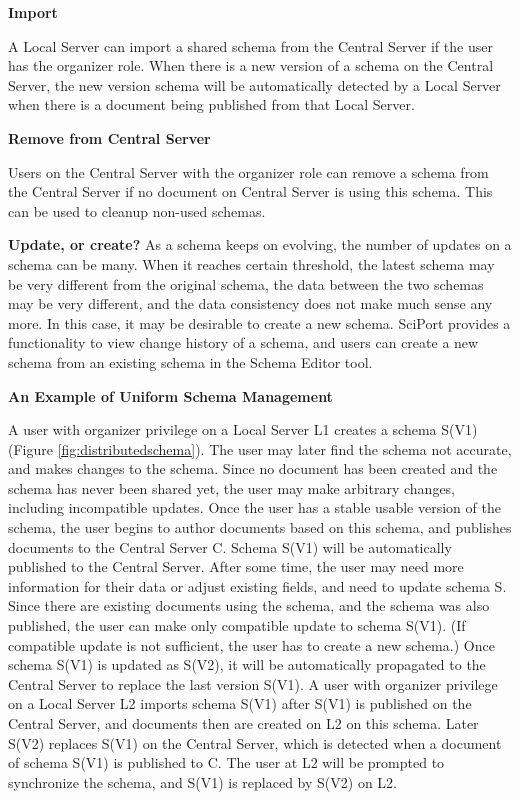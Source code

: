 \documentclass{doublecol-new}
\theoremstyle{TH}{
\newtheorem{lemma}{Lemma}
\newtheorem{theorem}[lemma]{Theorem}
\newtheorem{corrolary}[lemma]{Corrolary}
\newtheorem{conjecture}[lemma]{Conjecture}
\newtheorem{proposition}[lemma]{Proposition}
\newtheorem{claim}[lemma]{Claim}
\newtheorem{stheorem}[lemma]{Wrong Theorem}
\newtheorem{algorithm}{Algorithm}
}
\theoremstyle{THrm}{
\newtheorem{definition}{Definition}[section]
\newtheorem{question}{Question}[section]
\newtheorem{remark}{Remark}
\newtheorem{scheme}{Scheme}
}
\theoremstyle{THhit}{
\newtheorem{case}{Case}[section]
}
\begin{document}
\textbf{Import}

A Local Server can import a shared schema from the Central Server if
the user has the organizer role. When there is a new version of a
schema on the Central Server, the new version schema will be
automatically detected by a Local Server when there is a document
being published from that Local Server.

\textbf{Remove from Central Server}

Users on the Central Server with the organizer role can remove a
schema from the Central Server if no document on Central Server is
using this schema. This can be used to cleanup non-used schemas.

\textbf{Update, or create?}  As a schema  keeps on evolving, the
number of updates on a schema can be many. When it reaches certain
threshold, the latest schema may be very different from the original
schema, the data between the two schemas may be very different, and
the data consistency does not make much sense any more.  In this
case, it may be desirable to create a new schema.  SciPort provides
a functionality to view change history of a schema, and users can
create a new schema from an existing schema in the Schema Editor
tool.


\textbf{An Example of Uniform Schema Management}

A user with organizer privilege on a Local Server L1 creates a
schema S(V1) (Figure \ref{fig:distributedschema}). The user may
later find the schema not accurate, and makes changes to the schema.
Since no document has been created and the schema has never been
shared yet, the user may make arbitrary changes, including
incompatible updates. Once the user has a stable usable version of
the schema, the user begins to author documents based on this
schema, and publishes documents to the Central Server C. Schema
S(V1) will be automatically published to the Central Server. After
some time, the user may need more information for their data or
adjust existing fields, and need to update schema S. Since there are
existing documents using the schema, and the schema was also
published, the user can make only compatible update to schema S(V1).
(If compatible update is not sufficient, the user has to create a
new schema.) Once schema S(V1) is updated as S(V2), it will be
automatically propagated to the Central Server to replace the last
version S(V1). A user with organizer privilege on a Local Server L2
imports schema S(V1) after S(V1) is published on the Central Server,
and documents then are created on L2 on this schema. Later S(V2)
replaces S(V1) on the Central Server, which is detected when a
document of schema S(V1) is published to C. The user at L2 will be
prompted to synchronize the schema, and S(V1) is replaced by S(V2)
on L2.
\end{document}
